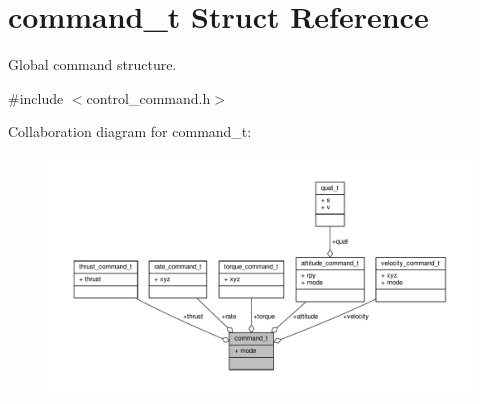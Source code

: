 \hypertarget{structcommand__t}{\section{command\+\_\+t Struct Reference}
\label{structcommand__t}
}


Global command structure.  




{\ttfamily \#include $<$control\+\_\+command.\+h$>$}



Collaboration diagram for command\+\_\+t\+:
\nopagebreak
\begin{figure}[H]
\begin{center}
\leavevmode
\includegraphics[width=350pt]{structcommand__t__coll__graph}
\end{center}
\end{figure}
